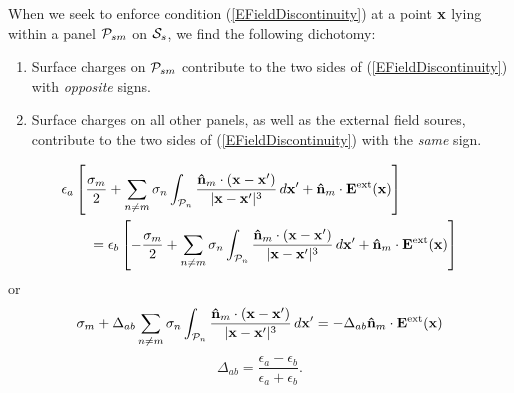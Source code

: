 \documentclass[letterpaper]{article}
\begin{document}
When we seek to enforce condition (\ref{EFieldDiscontinuity}) 
at a point $\mathbf{x}$ lying within a panel $\mathcal{P}_{sm}$
on $\mathcal{S}_s$, we find the following dichotomy:
\begin{enumerate}
  \item Surface charges on $\mathcal{P}_{sm}$ contribute to 
        the two sides of (\ref{EFieldDiscontinuity})
        with \textit{opposite} signs.
  \item Surface charges on all other panels, as well as the 
        external field soures, contribute
        to the two sides of (\ref{EFieldDiscontinuity})
        with the \textit{same} sign.
\end{enumerate}
\begin{align*}
&\epsilon_a 
   \left[ \frac{\sigma_m}{2} 
          + \sum_{n\ne m} \sigma_n \int_{\mathcal{P}_{n}}
            \frac{ \mathbf{\hat n}_m \cdot (\mathbf{x}-\mathbf{x}^\prime)}
                 { |\mathbf{x}-\mathbf{x}^\prime|^3 } \, d\mathbf{x}^\prime
          + \mathbf{\hat n}_m \cdot \mathbf{E}^{\hbox{\scriptsize{ext}}}(\mathbf{x})
   \right]
\\
&\qquad
=\epsilon_b 
   \left[  -\frac{\sigma_m}{2} 
          + \sum_{n\ne m} \sigma_n \int_{\mathcal{P}_{n}}
            \frac{ \mathbf{\hat n}_m \cdot (\mathbf{x}-\mathbf{x}^\prime)}
                 { |\mathbf{x}-\mathbf{x}^\prime|^3 } \, d\mathbf{x}^\prime
          + \mathbf{\hat n}_m \cdot \mathbf{E}^{\hbox{\scriptsize{ext}}}(\mathbf{x})
   \right]
\end{align*}
or 
$$ \sigma_m 
  + \Delta_{ab}
    \sum_{n\ne m} \sigma_n \int_{\mathcal{P}_{n}}
    \frac{ \mathbf{\hat n}_m \cdot (\mathbf{x}-\mathbf{x}^\prime)}
         { |\mathbf{x}-\mathbf{x}^\prime|^3 } \, d\mathbf{x}^\prime
   = -\Delta_{ab}\mathbf{\hat n}_m \cdot \mathbf{E}^{\hbox{\scriptsize{ext}}}(\mathbf{x})
$$ 
$$\Delta_{ab} = \frac{\epsilon_a-\epsilon_b}{\epsilon_a + \epsilon_b}.$$

\end{document}
